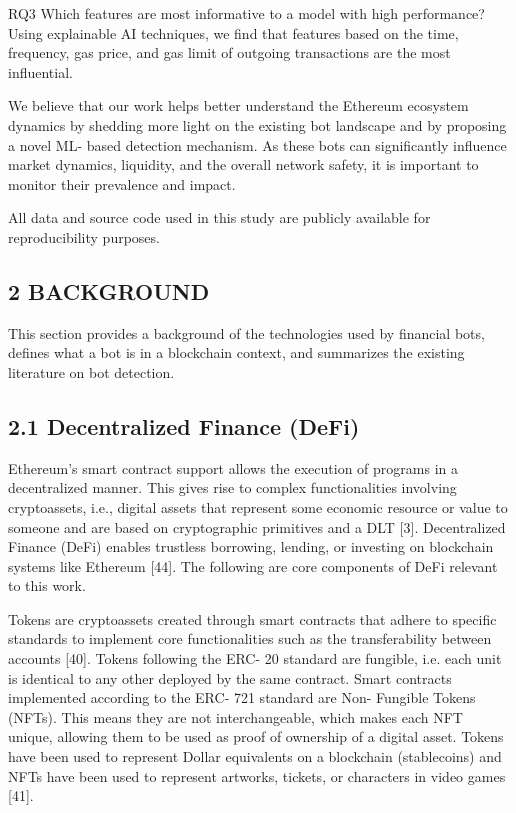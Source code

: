 RQ3 Which features are most informative to a model with high performance? Using explainable AI techniques, we find that features based on the time, frequency, gas price, and gas limit of outgoing transactions are the most influential.

We believe that our work helps better understand the Ethereum ecosystem dynamics by shedding more light on the existing bot landscape and by proposing a novel ML- based detection mechanism. As these bots can significantly influence market dynamics, liquidity, and the overall network safety, it is important to monitor their prevalence and impact.

All data and source code used in this study are publicly available for reproducibility purposes.

\subsection*{2 BACKGROUND}

This section provides a background of the technologies used by financial bots, defines what a bot is in a blockchain context, and summarizes the existing literature on bot detection.

\subsection*{2.1 Decentralized Finance (DeFi)}

Ethereum's smart contract support allows the execution of programs in a decentralized manner. This gives rise to complex functionalities involving cryptoassets, i.e., digital assets that represent some economic resource or value to someone and are based on cryptographic primitives and a DLT [3]. Decentralized Finance (DeFi) enables trustless borrowing, lending, or investing on blockchain systems like Ethereum [44]. The following are core components of DeFi relevant to this work.

Tokens are cryptoassets created through smart contracts that adhere to specific standards to implement core functionalities such as the transferability between accounts [40]. Tokens following the ERC- 20 standard are fungible, i.e. each unit is identical to any other deployed by the same contract. Smart contracts implemented according to the ERC- 721 standard are Non- Fungible Tokens (NFTs). This means they are not interchangeable, which makes each NFT unique, allowing them to be used as proof of ownership of a digital asset. Tokens have been used to represent Dollar equivalents on a blockchain (stablecoins) and NFTs have been used to represent artworks, tickets, or characters in video games [41].

